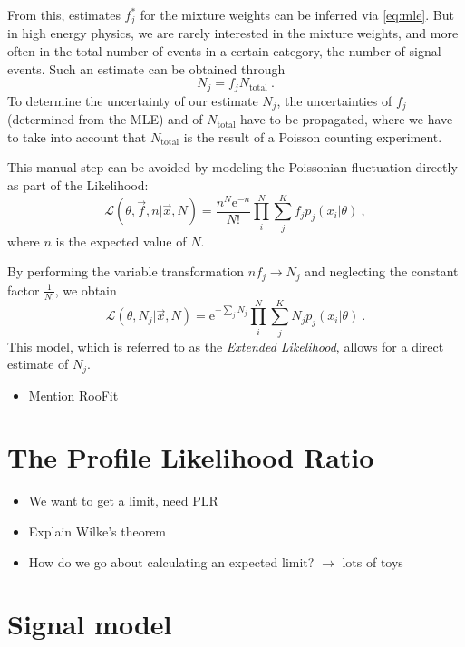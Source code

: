 From this, estimates $f_j^*$ for the mixture weights can be inferred via \eqref{eq:mle}.
But in high energy physics, we are rarely interested in the mixture weights, and more often in the total number of events in a certain category, \eg the number of signal events.
Such an estimate can be obtained through
\begin{equation}
  N_j = f_j N_\text{total}\:.
\end{equation}
To determine the uncertainty of our estimate $N_j$, the uncertainties of $f_j$ (determined from the \gls{MLE}) and of $N_\text{total}$ have to be propagated, where we have to take into account that $N_\text{total}$ is the result of a Poisson counting experiment.

This manual step can be avoided by modeling the Poissonian fluctuation directly as part of the Likelihood:
\begin{equation}
  \mathcal{L}(θ, \vec{f}, n | \vec{x}, N) = \frac{n^N\mathrm{e}^{-n}}{N!}  \prod_i^N \sum_j^K f_j p_j(x_i | θ)\:,
\end{equation}
where $n$ is the expected value of $N$.

By performing the variable transformation $n f_j \to N_j$ and neglecting the constant factor $\frac{1}{N!}$, we obtain
\begin{equation}
  \mathcal{L}(θ, N_j | \vec{x}, N) = \mathrm{e}^{-\sum_j N_j}  \prod_i^N \sum_j^K N_j p_j(x_i | θ)\:.
\end{equation}
This model, which is referred to as the \textit{Extended Likelihood}\cite{Lyons1986}, allows for a direct estimate of $N_j$.

\begin{itemize}
  \item Mention RooFit
\end{itemize}

\section{The Profile Likelihood Ratio}

\begin{itemize}
  \item We want to get a limit, need PLR
  \item Explain Wilke's theorem
  \item How do we go about calculating an expected limit? $\rightarrow$ lots of toys
\end{itemize}

\section{Signal model}

